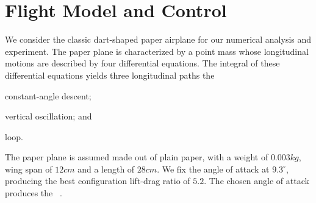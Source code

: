 \section{Flight Model and Control}
\label{sec:light_mpc}

We consider the classic dart-shaped paper airplane for our numerical analysis and experiment. The paper plane is characterized by a point mass whose longitudinal motions are described by four differential equations. The integral of these differential equations yields three longitudinal paths \ie the 
%
\begin{inparaenum}[(1)]
	\item constant-angle descent; 
	\item vertical oscillation; and
	\item loop.
\end{inparaenum} 
%
The paper plane is assumed made out of plain paper, with a weight of $0.003kg$, wing span of $12cm$ and a length of $28cm$. We fix the angle of attack at $9.3^\circ$, producing the best configuration lift-drag ratio of $5.2$. The chosen angle of attack produces the ~\cite{FlightDynamicsStengel}. 

